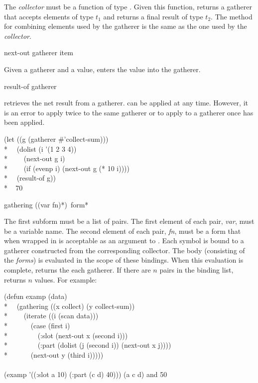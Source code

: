\begin{new}
\begin{defun}[Function]
The {\it collector} must be a function of type 
.  Given this function, 
returns a gatherer that accepts elements of type $t_1$ and returns a final
result of type $t_2$.  The method for combining elements used by the
gatherer is the same as the one used by the {\it collector}.
\end{defun}


\begin{defun}[Function]
next-out gatherer item

Given a gatherer and a value,  enters the value into the
gatherer.
\end{defun}


\begin{defun}[Function]
result-of gatherer

 retrieves the net result from a gatherer.  
can be applied at any time.  However, it is an error to apply 
 twice to the same gatherer or to apply  to a
gatherer once  has been applied.
\begin{lisp}
(let ((g (gatherer \#'collect-sum))) \\*
~~(dolist (i '(1 2 3 4)) \\*
~~~~(next-out g i) \\*
~~~~(if (evenp i) (next-out g (* 10 i)))) \\*
~~(result-of g)) \\*
~{\EV} 70
\end{lisp}
\end{defun}

\begin{defmac}
gathering ({(var fn)}*) {\,form}*

The first subform must be a list of pairs.  The first
element of each pair, {\it var}, must be a variable name.
The second element of each pair, {\it fn},
must be a form that when wrapped in  is
acceptable as an argument to .  Each symbol is bound to a
gatherer constructed from the corresponding collector.  The body
(consisting of the {\it forms}) is evaluated in the scope of these bindings. 
When this evaluation is complete,  returns the  each
gatherer.  If there are $n$ pairs in the binding list,
 returns $n$ values.  For example:
\begin{lisp}
(defun examp (data) \\*
~~(gathering ((x collect) (y collect-sum)) \\*
~~~~(iterate ((i (scan data))) \\*
~~~~~~(case (first i) \\*
~~~~~~~~(:slot (next-out x (second i))) \\*
~~~~~~~~(:part (dolist (j (second i)) (next-out x j)))) \\*
~~~~~~(next-out y (third i))))) \\
\\
(examp '((:slot a 10) (:part (c d) 40))) {\EV} (a c d) {\rm and} 50
\end{lisp}


\end{defmac}
\end{new}
